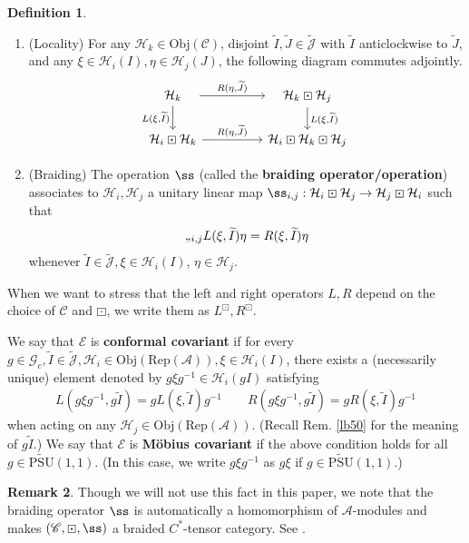 \documentclass[11pt,b5paper,notitlepage]{article}
\theoremstyle{definition}
\newtheorem{df}{Definition}[section]
\newtheorem{rem}[df]{Remark}
\theoremstyle{plain}
\newcommand{\mc}{\mathcal}
\newcommand{\wtd}{\widetilde}
\newcommand{\Rep}{\mathrm{Rep}}
\newcommand{\scr}{\mathscr}
\newcommand{\Jtd}{\widetilde{\mathcal J}}
\newcommand{\UPSU}{\widetilde{\mathrm{PSU}}(1,1)}
\newcommand{\Gc}{\mathscr G_c}
\newcommand{\Obj}{\mathrm{Obj}}
\numberwithin{equation}{section}
\begin{document}
\begin{df}
\begin{enumerate}[label=(\alph*)]
\item (Locality) For any $\mc H_k\in\Obj(\scr C)$, disjoint $\wtd I,\wtd J\in\Jtd$ with $\wtd I$ anticlockwise to $\wtd J$, and any $\xi\in\mc H_i(I),\eta\in\mc H_j(J)$, the following diagram commutes adjointly.
\begin{equation}
\begin{tikzcd}
\quad \mc H_k\quad \arrow[rr,"{R(\eta,\wtd J)}"] \arrow[d, "{L(\xi,\wtd I)}"'] &&\quad \mc H_k\boxdot\mc H_j\quad \arrow[d, "{L(\xi,\wtd I)}"]\\
\mc H_i\boxdot\mc H_k\arrow[rr,"{R(\eta,\wtd J)}"] &&\mc H_i\boxdot\mc H_k\boxdot\mc H_j
\end{tikzcd}
\end{equation}
\item (Braiding) The operation $\ss$ (called the \textbf{braiding operator/operation}) associates to $\mc H_i,\mc H_j$ a unitary linear map $\ss_{i,j}:\mc H_i\boxdot\mc H_j\rightarrow\mc H_j\boxdot \mc H_i$ such that  
\begin{align}
\ss_{i,j} L(\xi,\wtd I)\eta=R(\xi,\wtd I)\eta\label{eq8}
\end{align}
whenever $\wtd I\in\Jtd,\xi\in\mc H_i(I)$, $\eta\in\mc H_j$.
\end{enumerate}
When we want to stress that the left and right operators $L,R$ depend on the choice of $\scr C$ and $\boxdot$, we write them as $L^\boxdot,R^\boxdot$. 

We say that $\scr E$ is \textbf{conformal covariant} if for every $g\in\Gc,\wtd I\in\Jtd,\mc H_i\in\Obj(\Rep(\mc A)),\xi\in\mc H_i(I)$, there exists a (necessarily unique) element denoted by $g\xi g^{-1}\in\mc H_i(gI)$ satisfying
\begin{align}
L(g\xi g^{-1},g\wtd I)=gL(\xi,\wtd I)g^{-1}\qquad R(g\xi g^{-1},g\wtd I)=gR(\xi,\wtd I)g^{-1}
\end{align}
when acting on any $\mc H_j\in\Obj(\Rep(\mc A))$. (Recall Rem. \ref{lb50} for the meaning of $g\wtd I$.) We say that $\scr E$ is \textbf{M\"obius covariant} if the above condition holds for all $g\in\UPSU$. (In this case, we write $g\xi g^{-1}$ as $g\xi$ if $g\in\UPSU$.)   \hfill\qedsymbol
\end{df}

\begin{rem}
Though we will not use this fact in this paper, we note that the braiding operator $\ss$ is automatically a homomorphism of $\mc A$-modules and makes $(\scr C,\boxdot,\ss)$ a braided $C^*$-tensor category. See \cite[Thm. 3.9]{Gui21a}.
\end{rem}
\end{document}
